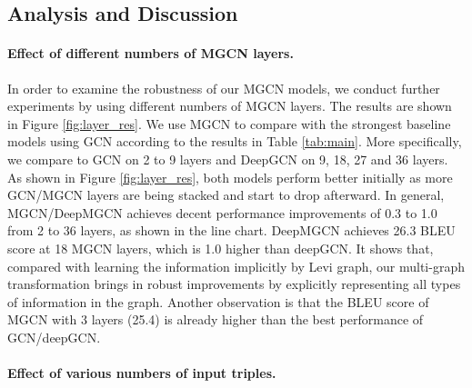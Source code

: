 \documentclass[11pt,a4paper]{article}
\begin{document}
\subsection{Analysis and Discussion}

\paragraph{Effect of different numbers of MGCN layers.}
In order to examine the robustness of our MGCN models, we conduct further experiments by using different numbers of MGCN layers.
The results are shown in Figure \ref{fig:layer_res}.
We use MGCN to compare with the strongest baseline models using GCN according to the results in Table \ref{tab:main}.
More specifically, we compare to GCN on 2 to 9 layers and DeepGCN on 9, 18, 27 and 36 layers.
As shown in Figure \ref{fig:layer_res},
both models perform better initially as more GCN/MGCN layers are being stacked and start to drop afterward.
In general, MGCN/DeepMGCN achieves decent performance improvements of 0.3 to 1.0 from 2 to 36 layers, as shown in the line chart.
DeepMGCN achieves 26.3 BLEU score at 18 MGCN layers, which is 1.0 higher than deepGCN. 
It shows that, compared with learning the information implicitly by Levi graph, our multi-graph transformation brings in robust improvements by explicitly representing all types of information in the graph.
Another observation is that the BLEU score of MGCN with 3 layers (25.4) is already higher than the best performance of GCN/deepGCN.










\paragraph{Effect of various numbers of input triples.}

\begin{table}[t!]
	\centering
\caption{Effect of different numbers of input triples.}
	\label{tab:triples}
\end{table}
\end{document}
